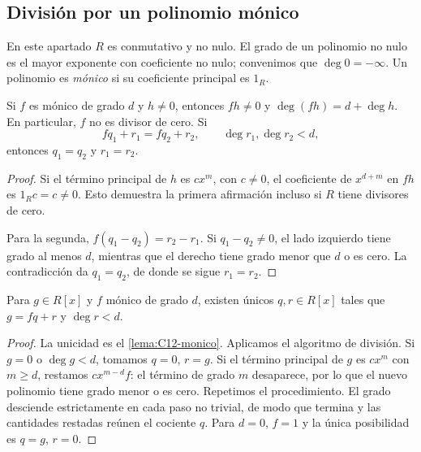 \subsection{División por un polinomio mónico}
En este apartado $R$ es conmutativo y no nulo. El grado de un polinomio no nulo es el mayor exponente con coeficiente no nulo; convenimos que $\deg0=-\infty$. Un polinomio es \emph{mónico} si su coeficiente principal es $1_R$.

\begin{lema}\label{lema:C12-monico}
Si $f$ es mónico de grado $d$ y $h\ne0$, entonces $fh\ne0$ y $\deg(fh)=d+\deg h$. En particular, $f$ no es divisor de cero. Si
\[
fq_1+r_1=fq_2+r_2,\qquad \deg r_1,\deg r_2<d,
\]
entonces $q_1=q_2$ y $r_1=r_2$.
\end{lema}
\begin{proof}
Si el término principal de $h$ es $cx^m$, con $c\ne0$, el coeficiente de $x^{d+m}$ en $fh$ es $1_Rc=c\ne0$. Esto demuestra la primera afirmación incluso si $R$ tiene divisores de cero.

Para la segunda, $f(q_1-q_2)=r_2-r_1$. Si $q_1-q_2\ne0$, el lado izquierdo tiene grado al menos $d$, mientras que el derecho tiene grado menor que $d$ o es cero. La contradicción da $q_1=q_2$, de donde se sigue $r_1=r_2$.
\end{proof}

\begin{samepage}
\begin{prop}\label{prop:C12-division}
Para $g\in R[x]$ y $f$ mónico de grado $d$, existen únicos $q,r\in R[x]$ tales que $g=fq+r$ y $\deg r<d$.
\end{prop}
\begin{proof}
La unicidad es el \cref{lema:C12-monico}. Aplicamos el algoritmo de división. Si $g=0$ o $\deg g<d$, tomamos $q=0$, $r=g$. Si el término principal de $g$ es $cx^m$ con $m\geq d$, restamos $cx^{m-d}f$: el término de grado $m$ desaparece, por lo que el nuevo polinomio tiene grado menor o es cero. Repetimos el procedimiento. El grado desciende estrictamente en cada paso no trivial, de modo que termina y las cantidades restadas reúnen el cociente $q$. Para $d=0$, $f=1$ y la única posibilidad es $q=g$, $r=0$.
\end{proof}
\end{samepage}


